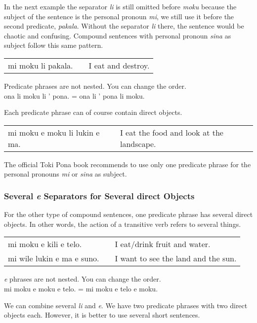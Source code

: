 In the next example the separator \textit{li} is still omitted before \textit{moku} because the subject of the sentence is the personal pronoun \textit{mi}, we still use it before the second predicate, \textit{pakala}.
Without the separator \textit{li} there, the sentence would be chaotic and confusing.
Compound sentences with personal pronoun \textit{sina} as subject follow this same pattern.

\begin{supertabular}{p{5,5cm}|ll}
    mi moku li pakala. &  & I eat and destroy. \\
\end{supertabular}

Predicate phrases are not nested. You can change the order. \\
ona li moku li ' pona. = ona li ' pona li moku.

Each predicate phrase can of course contain direct objects.

\begin{supertabular}{p{5,5cm}|ll}
    mi moku e moku li lukin e ma. &  & I eat the food and look at the landscape. \\
\end{supertabular}

The official Toki Pona book recommends to use only one predicate phrase for the personal pronouns \textit{mi} or \textit{sina} as subject.

\label{'multiple_e'}
\subsubsection*{Several \textit{e} Separators for Several direct Objects}
For the other type of compound sentences, one predicate phrase has several direct objects.
In other words, the action of a transitive verb refers to several things.

\begin{supertabular}{p{5,5cm}|ll}
    mi moku e kili e telo.     &  & I eat/drink fruit and water.        \\
    mi wile lukin e ma e suno. &  & I want to see the land and the sun. \\
\end{supertabular}

\textit{e} phrases are not nested. You can change the order. \\
mi moku e moku e telo. = mi moku e telo e moku.

We can combine several \textit{li} and \textit{e}.
We have two predicate phrases with two direct objects each.
However, it is better to use several short sentences.


